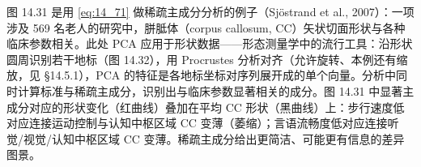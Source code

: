 \begin{example}[胼胝体形状研究]
图 14.31 是用 \eqref{eq:14_71} 做稀疏主成分分析的例子（Sjöstrand et al., 2007）：一项涉及 569 名老人的研究中，胼胝体（corpus callosum, CC）矢状切面形状与各种临床参数相关。此处 PCA 应用于形状数据——形态测量学中的流行工具：沿形状圆周识别若干地标（图 14.32），用 Procrustes 分析对齐（允许旋转、本例还有缩放，见 §14.5.1），PCA 的特征是各地标坐标对序列展开成的单个向量。分析中同时计算标准与稀疏主成分，识别出与临床参数显著相关的成分。图 14.31 中显著主成分对应的形状变化（红曲线）叠加在平均 CC 形状（黑曲线）上：步行速度低对应连接运动控制与认知中枢区域 CC 变薄（萎缩）；言语流畅度低对应连接听觉/视觉/认知中枢区域 CC 变薄。稀疏主成分给出更简洁、可能更有信息的差异图景。
\end{example}
